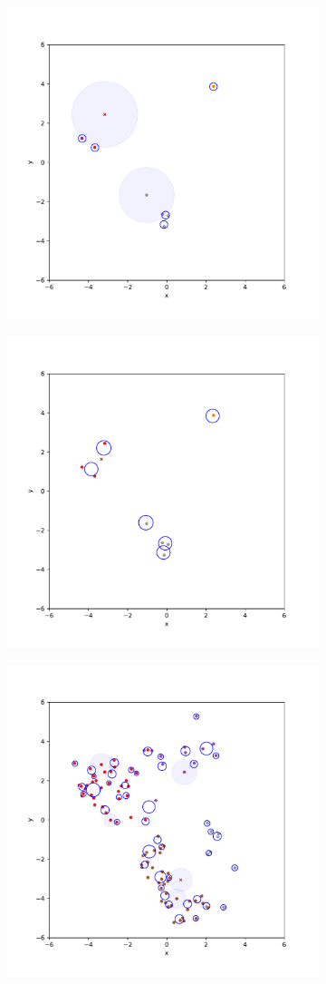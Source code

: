 \documentclass{beamer}
\begin{document}
\begin{frame}
    \centering
    \includegraphics[width=9.1cm]{step4.pdf}
\end{frame}

\begin{frame}
    \centering
    \includegraphics[width=9.1cm]{step5.pdf}
\end{frame}

\begin{frame}
    \centering
    \includegraphics[width=9.1cm]{step6.pdf}
\end{frame}
\end{document}
